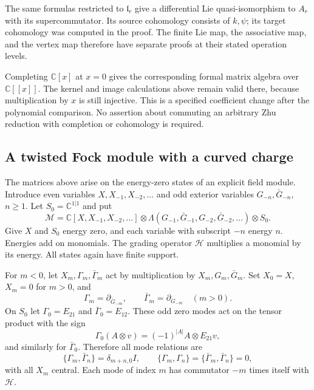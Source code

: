 The same formulas restricted to \(\mathfrak l_r\) give a
differential Lie quasi-isomorphism to \(A_r\) with its
supercommutator. Its source cohomology consists of \(k,\psi\);
its target cohomology was computed in the proof.
The finite Lie map, the associative map, and the vertex map
therefore have separate proofs at their stated operation levels.

Completing \(\mathbb C[x]\) at \(x=0\) gives the corresponding
formal matrix algebra over \(\mathbb C[[x]]\).
The kernel and image calculations above remain valid there,
because multiplication by \(x\) is still injective.
This is a specified coefficient change after the polynomial
comparison. No assertion about commuting an arbitrary Zhu
reduction with completion or cohomology is required.

\subsection{A twisted Fock module with a curved charge}

The matrices above arise on the energy-zero states of an explicit
field module. Introduce even variables \(X,X_{-1},X_{-2},\ldots\)
and odd exterior variables \(G_{-n},\bar G_{-n}\), \(n\ge1\).
Let \(S_0=\mathbb C^{1|1}\) and put
\[
 \mathcal M=
 \mathbb C[X,X_{-1},X_{-2},\ldots]\otimes
 \Lambda(G_{-1},\bar G_{-1},G_{-2},\bar G_{-2},\ldots)
 \otimes S_0.
\]
Give \(X\) and \(S_0\) energy zero, and each variable with
subscript \(-n\) energy \(n\). Energies add on monomials.
The grading operator \(\mathcal H\) multiplies a monomial by
its energy. All states again have finite support.

For \(m<0\), let \(X_m,\Gamma_m,\bar\Gamma_m\) act by
multiplication by \(X_m,G_m,\bar G_m\).
Set \(X_0=X\), \(X_m=0\) for \(m>0\), and
\[
 \Gamma_m=\partial_{\bar G_{-m}},\qquad
 \bar\Gamma_m=\partial_{G_{-m}}\quad(m>0).
\]
On \(S_0\) let \(\Gamma_0=E_{21}\) and
\(\bar\Gamma_0=E_{12}\). These odd zero modes act on the tensor
product with the sign
\[
 \Gamma_0(A\otimes v)=(-1)^{|A|}A\otimes E_{21}v,
\]
and similarly for \(\bar\Gamma_0\). Therefore all mode relations are
\[
 \{\Gamma_m,\bar\Gamma_n\}=\delta_{m+n,0}I,\qquad
 \{\Gamma_m,\Gamma_n\}=\{\bar\Gamma_m,\bar\Gamma_n\}=0,
\]
with all \(X_m\) central. Each mode of index \(m\) has
commutator \(-m\) times itself with \(\mathcal H\).

